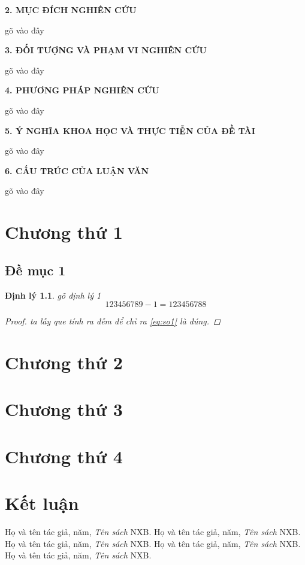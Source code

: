 ﻿\documentclass[12pt,a4paper,openany,oneside]{report}
\newtheorem{dl}{Định lý}[chapter]
\def\n{\noindent}
\def\m{\medskip}
\def\m{\medskip}
\def\n{\noindent}
\begin{document}
\n \MakeUppercase{\bf 2. Mục đích nghiên cứu}

\n gõ vào đây
\m
\m

\n \MakeUppercase{\bf 3. Đối tượng và phạm vi nghiên cứu}

\n gõ vào đây
\m 

\n \MakeUppercase{\bf 4. Phương pháp nghiên cứu}

\n gõ vào đây
\m

\n \MakeUppercase{\bf 5. Ý nghĩa khoa học và thực tiễn của đề tài}

\n gõ vào đây

\bigskip

\n \MakeUppercase{\bf 6. Cấu trúc của luận văn}
\m

gõ vào đây


\chapter{Chương thứ 1}
\section{Đề mục 1}
\begin{dl}
gõ định lý 1
\begin{equation}%
123456789-1=123456788
\end{equation}
\begin{proof}%
ta lấy que tính ra đếm để chỉ ra \eqref{eq:so1} là đúng.
\end{proof}
\end{dl}

\chapter{Chương thứ 2}

\chapter{Chương thứ 3}

\chapter{Chương thứ 4}

\chapter*{Kết luận}

\begin{thebibliography}{12}
Họ và tên tác giả, năm, {\it Tên sách} NXB.
Họ và tên tác giả, năm, {\it Tên sách} NXB.
Họ và tên tác giả, năm, {\it Tên sách} NXB.
Họ và tên tác giả, năm, {\it Tên sách} NXB.
Họ và tên tác giả, năm, {\it Tên sách} NXB.
\end{thebibliography}
\end{document}
